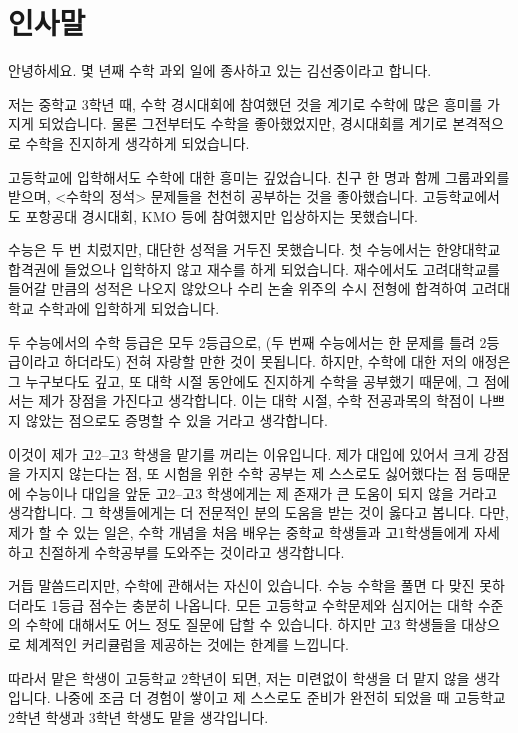 \documentclass{oblivoir}
\begin{document}
\section{인사말}
안녕하세요.
몇 년째 수학 과외 일에 종사하고 있는 김선중이라고 합니다.

저는 중학교 3학년 때, 수학 경시대회에 참여했던 것을 계기로 수학에 많은 흥미를 가지게 되었습니다.
물론 그전부터도 수학을 좋아했었지만, 경시대회를 계기로 본격적으로 수학을 진지하게 생각하게 되었습니다.

고등학교에 입학해서도 수학에 대한 흥미는 깊었습니다.
친구 한 명과 함께 그룹과외를 받으며, <수학의 정석> 문제들을 천천히 공부하는 것을 좋아했습니다.
고등학교에서도 포항공대 경시대회, KMO 등에 참여했지만 입상하지는 못했습니다.

수능은 두 번 치렀지만, 대단한 성적을 거두진 못했습니다.
첫 수능에서는 한양대학교 합격권에 들었으나 입학하지 않고 재수를 하게 되었습니다.
재수에서도 고려대학교를 들어갈 만큼의 성적은 나오지 않았으나 수리 논술 위주의 수시 전형에 합격하여 고려대학교 수학과에 입학하게 되었습니다.

두 수능에서의 수학 등급은 모두 2등급으로, (두 번째 수능에서는 한 문제를 틀려 2등급이라고 하더라도) 전혀 자랑할 만한 것이 못됩니다.
하지만, 수학에 대한 저의 애정은 그 누구보다도 깊고, 또 대학 시절 동안에도 진지하게 수학을 공부했기 때문에, 그 점에서는 제가 장점을 가진다고 생각합니다.
이는 대학 시절, 수학 전공과목의 학점이 나쁘지 않았는 점으로도 증명할 수 있을 거라고 생각합니다.

이것이 제가 고2--고3 학생을 맡기를 꺼리는 이유입니다.
제가 대입에 있어서 크게 강점을 가지지 않는다는 점, 또 시험을 위한 수학 공부는 제 스스로도 싫어했다는 점 등때문에 수능이나 대입을 앞둔 고2--고3 학생에게는 제 존재가 큰 도움이 되지 않을 거라고 생각합니다.
그 학생들에게는 더 전문적인 분의 도움을 받는 것이 옳다고 봅니다.
다만, 제가 할 수 있는 일은, 수학 개념을 처음 배우는 중학교 학생들과 고1학생들에게 자세하고 친절하게 수학공부를 도와주는 것이라고 생각합니다.

거듭 말씀드리지만, 수학에 관해서는 자신이 있습니다.
수능 수학을 풀면 다 맞진 못하더라도 1등급 점수는 충분히 나옵니다.
모든 고등학교 수학문제와 심지어는 대학 수준의 수학에 대해서도 어느 정도 질문에 답할 수 있습니다.
하지만 고3 학생들을 대상으로 체계적인 커리큘럼을 제공하는 것에는 한계를 느낍니다.

따라서 맡은 학생이 고등학교 2학년이 되면, 저는 미련없이 학생을 더 맡지 않을 생각입니다.
나중에 조금 더 경험이 쌓이고 제 스스로도 준비가 완전히 되었을 때 고등학교 2학년 학생과 3학년 학생도 맡을 생각입니다.
\end{document}
